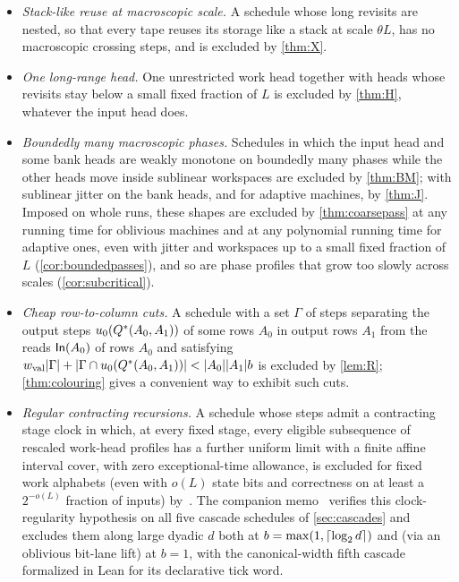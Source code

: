 \begin{itemize}[leftmargin=1.5em]
\item \emph{Stack-like reuse at macroscopic scale.} A schedule whose long revisits are nested, so that every tape reuses its
storage like a stack at scale $\theta L$, has no macroscopic crossing steps, and is excluded by \cref{thm:X}.
\item \emph{One long-range head.} One unrestricted work head together with heads whose revisits stay below a small fixed fraction
of $L$ is excluded by \cref{thm:H}, whatever the input head does.
\item \emph{Boundedly many macroscopic phases.} Schedules in which the input head and some bank heads are weakly monotone on boundedly many
phases while the other heads move inside sublinear workspaces are excluded by \cref{thm:BM}; with sublinear jitter on the bank heads, and
for adaptive machines, by \cref{thm:J}. Imposed on whole runs, these shapes are excluded by \cref{thm:coarsepass} at any running time for
oblivious machines and at any polynomial running time for adaptive ones, even with jitter and workspaces up to a small fixed fraction of
$L$ (\cref{cor:boundedpasses}), and so are phase profiles that grow too slowly across scales (\cref{cor:subcritical}).
\item \emph{Cheap row-to-column cuts.} A schedule with a set $\Gamma$ of steps separating the output steps $u_0(Q^{*}(A_0,A_1))$ of some
rows $A_0$ in output rows $A_1$ from the reads $\mathsf{In}(A_0)$ of rows $A_0$ and satisfying
$w_{\mathrm{val}}\lvert \Gamma \rvert+\lvert \Gamma\cap u_0(Q^{*}(A_0,A_1)) \rvert<\lvert A_0 \rvert\lvert A_1 \rvert b$ is excluded by \cref{lem:R};
\cref{thm:colouring} gives a convenient way to exhibit such cuts.
\item \emph{Regular contracting recursions.} A schedule whose steps admit a contracting stage clock in which, at every fixed stage, every
eligible subsequence of rescaled work-head profiles has a further uniform limit with a finite affine interval cover, with zero
exceptional-time allowance, is excluded for fixed work alphabets (even with $o(L)$ state bits and correctness on at least a $2^{-o(L)}$
fraction of inputs) by~\cite[Theorem~7.5, Lean-verified]{SecondPaper2026}. The companion memo~\cite[Theorem~1.1]{CascadeObstructionMemo2026}
verifies this clock-regularity hypothesis on all five cascade schedules of \cref{sec:cascades} and excludes them along large dyadic $d$ both
at $b=\max(1,\lceil \log_2 d \rceil)$ and (via an oblivious bit-lane lift) at $b=1$, with the canonical-width fifth cascade formalized in Lean for its
declarative tick word.

\end{itemize}

